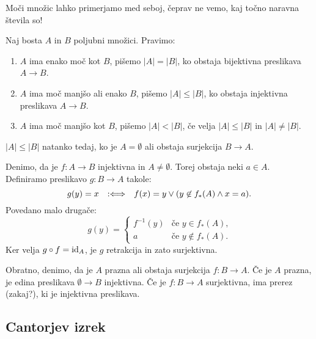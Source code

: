 Moči množic lahko primerjamo med seboj, čeprav ne vemo, kaj točno naravna števila so!

\begin{definicija}
  Naj bosta $A$ in $B$ poljubni množici. Pravimo:
  \begin{enumerate}
  \item $A$ ima enako moč kot $B$, pišemo $|A| = |B|$, ko obstaja bijektivna preslikava $A \to B$.
  \item $A$ ima moč manjšo ali enako $B$, pišemo $|A| \leq |B|$, ko obstaja injektivna preslikava $A \to B$.
  \item $A$ ima moč manjšo kot $B$, pišemo $|A| < |B|$, če velja $|A| \leq |B|$ in $|A| \neq |B|$.
  \end{enumerate}
\end{definicija}

\begin{izrek}
  \label{izr:leq-iff-empty-or-onto}
  $|A| \leq |B|$ natanko tedaj, ko je $A = \emptyset$ ali obstaja surjekcija $B \to A$.
\end{izrek}

\begin{dokaz}
  Denimo, da je $f : A \to B$ injektivna in $A \neq \emptyset$. Torej obstaja neki $a \in A$.
  Definiramo preslikavo $g : B \to A$ takole:
  \begin{equation*}
    g(y) = x  \defiff f(x) = y \lor (y \not\in f_{*}(A) \land x = a).
  \end{equation*}
  Povedano malo drugače:
  \begin{equation*}
    g(y) =
    \begin{cases}
      f^{-1}(y) & \text{če $y \in f_{*}(A)$,} \\
      a         & \text{če $y \not\in f_{*}(A)$.}
    \end{cases}
  \end{equation*}
  Ker velja $g \circ f = \id[A]$, je $g$ retrakcija in zato surjektivna.

  Obratno, denimo, da je $A$ prazna ali obstaja surjekcija $f : B \to A$. Če je $A$
  prazna, je edina preslikava $\emptyset \to B$ injektivna. Če je $f : B \to A$ surjektivna,
  ima prerez (zakaj?), ki je injektivna preslikava.
\end{dokaz}


\subsection{Cantorjev izrek}

